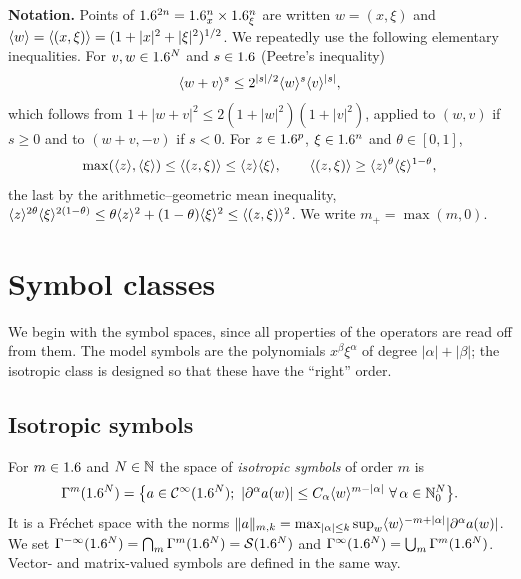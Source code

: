 \medskip\noindent\textbf{Notation.} Points of $1.6^{2n}=1.6^n_x\times1.6^n_\xi$
are written $w=(x,\xi)$ and $\langle w\rangle=\langle (x,\xi)\rangle=(1+|x|^2+|\xi|^2)^{1/2}$.
We repeatedly use the following elementary inequalities. For $v,w\in1.6^N$ and
$s\in1.6$ (Peetre's inequality)
\begin{equation}\label{isotropic:eq:peetre}
  \langle w+v\rangle^s\le 2^{|s|/2}\langle w\rangle^s\langle v\rangle^{|s|},
\end{equation}
which follows from $1+|w+v|^2\le 2(1+|w|^2)(1+|v|^2)$, applied to $(w,v)$ if
$s\ge0$ and to $(w+v,-v)$ if $s<0$. For $z\in1.6^p$, $\xi\in1.6^n$ and
$\theta\in[0,1]$,
\begin{equation}\label{isotropic:eq:split}
  \max(\langle z\rangle,\langle \xi\rangle)\le\langle (z,\xi)\rangle\le\langle z\rangle\langle \xi\rangle,\qquad
  \langle (z,\xi)\rangle\ge\langle z\rangle^\theta\langle \xi\rangle^{1-\theta},
\end{equation}
the last by the arithmetic--geometric mean inequality,
$\langle z\rangle^{2\theta}\langle \xi\rangle^{2(1-\theta)}\le\theta\langle z\rangle^2+(1-\theta)\langle \xi\rangle^2\le\langle (z,\xi)\rangle^2$.
We write $m_+=\max(m,0)$.

\section{Symbol classes}\label{isotropic:sec:symbols}

We begin with the symbol spaces, since all properties of the operators are
read off from them. The model symbols are the polynomials $x^\beta\xi^\alpha$
of degree $|\alpha|+|\beta|$; the isotropic class is designed so that these
have the ``right'' order.

\subsection{Isotropic symbols}

\begin{definition}\label{isotropic:def:Gamma}
For $m\in1.6$ and $N\in\mathbb{N}$ the space of \emph{isotropic symbols} of order $m$ is
\begin{equation*}
  \Gs{m}(\R^N)=\bigl\{a\in\CI(\R^N);\ |\pa^\alpha a(w)|\le C_\alpha\ang{w}^{m-|\alpha|}\ \forall\,\alpha\in\N_0^N\bigr\}.
\end{equation*}
It is a Fréchet space with the norms
$\lVert a\rVert_{m,k}=\max_{|\alpha|\le k}\sup_w\langle w\rangle^{-m+|\alpha|}|\partial^\alpha a(w)|$.
We set $\Gamma^{-\infty}(1.6^N)=\bigcap_m\Gamma^{m}(1.6^N)=\mathcal{S}(1.6^N)$ and
$\Gamma^{\infty}(1.6^N)=\bigcup_m\Gamma^{m}(1.6^N)$. Vector- and matrix-valued symbols are
defined in the same way.
\end{definition}


